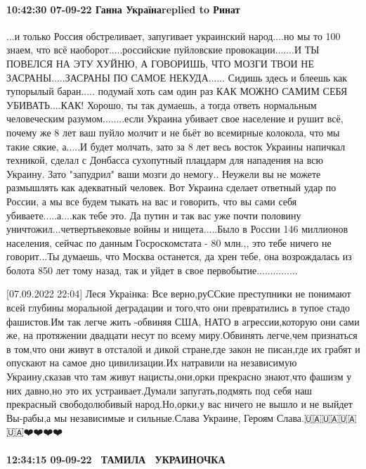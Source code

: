 \paragraph{10:42:30 07-09-22 Ганна Українаreplied to Ринат}

...и только Россия обстреливает, запугивает украинский народ....но мы то 100%
знаем, что всё наоборот.....российские пуйловские провокации.......И ТЫ ПОВЕЛСЯ
НА ЭТУ ХУЙНЮ, А ГОВОРИШЬ, ЧТО МОЗГИ ТВОИ НЕ ЗАСРАНЫ.....ЗАСРАНЫ ПО САМОЕ
НЕКУДА...... Сидишь здесь и блеешь как тупорылый баран..... подумай хоть сам
один раз КАК МОЖНО САМИМ СЕБЯ УБИВАТЬ....КАК! Хорошо, ты так думаешь, а тогда
ответь нормальным человеческим разумом........если Украина убивает свое
население и рушит всё, почему же 8 лет ваш пуйло молчит и не бьёт во всемирные
колокола, что мы такие сякие, а.....И будет молчать, зато за 8 лет весь восток
Украины напичкал техникой, сделал с Донбасса сухопутный плацдарм для нападения
на всю Украину. Зато "запудрил" ваши мозги до немогу.. Неужели вы не можете
размышлять как адекватный человек. Вот Украина сделает ответный удар по России,
а мы все будем тыкать на вас и говорить, что вы сами себя убиваете.....а....как
тебе это. Да путин и так вас уже почти половину уничтожил...четвертьвековые
войны и нищета.....Было в России 146 миллионов населения, сейчас по данным
Госроскомстата - 80 млн.,, это тебе ничего не говорит...Ты думаешь, что Москва
останется, да хрен тебе, она возрождалась из болота 850 лет тому назад, так и
уйдет в свое первобытие...............


[07.09.2022 22:04] Леся Украiнка: Все верно,руССкие преступники не понимают
всей глубины моральной деградации и того,что они превратились в тупое стадо
фашистов.Им так легче жить -обвиняя США, НАТО в агрессии,которую они сами же,
на протяжении двадцати несут по всему миру.Обвинять легче,чем признаться в
том,что они живут в отсталой и дикой стране,где закон не писан,где их грабят и
опускают на самое дно цивилизации.Их натравили на независимую Украину,сказав
что там живут нацисты,они,орки прекрасно знают,что фашизм у них давно,но это их
устраивает.Думали запугать,подмять под себя наш прекрасный свободолюбивый
народ.Но,орки,у вас ничего не вышло и не выйдет Вы-рабы,а мы независимые и
сильные.Слава Украине, Героям Слава.🇺🇦🇺🇦🇺🇦🇺🇦❤️❤️❤️❤️


\paragraph{12:34:15 09-09-22 💙💛ТАМИЛА 💙💛УКРАИНОЧКА 💙💛}

